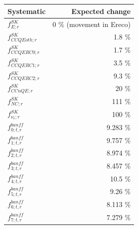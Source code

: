 \begin{table}[b]
\scriptsize
\centering
\begin{tabular}{| l | r |}
\hline
                                                              {\bf Systematic}   & {\bf Expected change}  \\ 
\hline
                                                                 $f_{E; r}^{SK}$ &               0 \%  (movement in Ereco) \\ 
                                                           $f_{CCQEoth; r}^{SK}$ &             1.8 \%  \\ 
                                                           $f_{CCQERC0; r}^{SK}$ &             1.7 \%  \\ 
                                                           $f_{CCQERC1; r}^{SK}$ &             3.5 \%  \\ 
                                                           $f_{CCQERC2; r}^{SK}$ &             9.3 \%  \\ 
                                                             $f_{CCnQE; r}^{SK}$ &              20 \%  \\ 
                                                                $f_{NC; r}^{SK}$ &             111 \%  \\ 
                                                             $f_{\nu_e; r}^{SK}$ &             100 \%  \\ 
                                                           $f_{0; t, r}^{banff}$ &           9.283 \%  \\ 
                                                           $f_{1; t, r}^{banff}$ &           9.757 \%  \\ 
                                                           $f_{2; t, r}^{banff}$ &           8.974 \%  \\ 
                                                           $f_{3; t, r}^{banff}$ &           8.457 \%  \\ 
                                                           $f_{4; t, r}^{banff}$ &            10.5 \%  \\ 
                                                           $f_{5; t, r}^{banff}$ &            9.26 \%  \\ 
                                                           $f_{6; t, r}^{banff}$ &           8.113 \%  \\ 
                                                           $f_{7; t, r}^{banff}$ &           7.279 \%  \\ 

\end{tabular}
\end{table}
